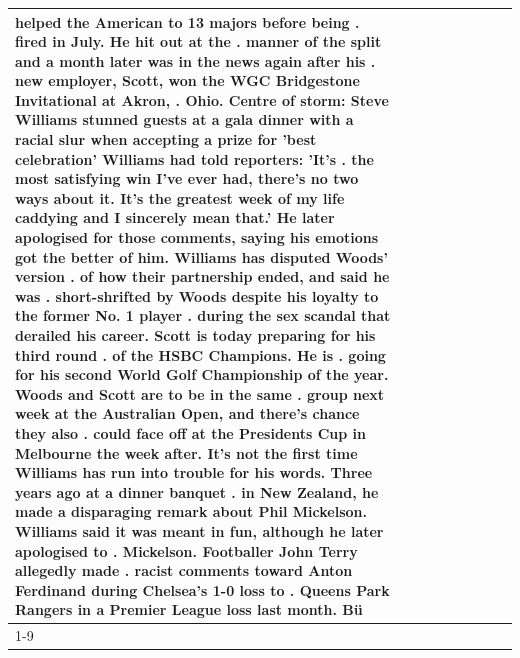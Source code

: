 \begin{table}[H]
\begin{tabular}{lllrlllll}
helped the American to 13 majors before being . fired in July. He hit out at the . manner of the split and a month later was in the news again after his . new employer, Scott, won the WGC Bridgestone Invitational at Akron, . Ohio. Centre of storm: Steve Williams stunned guests at a gala dinner with a racial slur when accepting a prize for 'best celebration' Williams had told reporters: 'It's . the most satisfying win I've ever had, there's no two ways about it. It's the greatest week of my life caddying and I sincerely mean that.' He later apologised for those comments, saying his emotions got the better of him. Williams has disputed Woods' version . of how their partnership ended, and said he was . short-shrifted by Woods despite his loyalty to the former No. 1 player . during the sex scandal that derailed his career. Scott is today preparing for his third round . of the HSBC Champions. He is . going for his second World Golf Championship of the year. Woods and Scott are to be in the same . group next week at the Australian Open, and there's chance they also . could face off at the Presidents Cup in Melbourne the week after. It's not the first time Williams has run into trouble for his words. Three years ago at a dinner banquet . in New Zealand, he made a disparaging remark about Phil Mickelson. Williams said it was meant in fun, although he later apologised to . Mickelson. Footballer John Terry allegedly made . racist comments toward Anton Ferdinand during Chelsea's 1-0 loss to . Queens Park Rangers in a Premier League loss last month. Bü \\
\cline{1-9}

\end{tabular}
\end{table}
